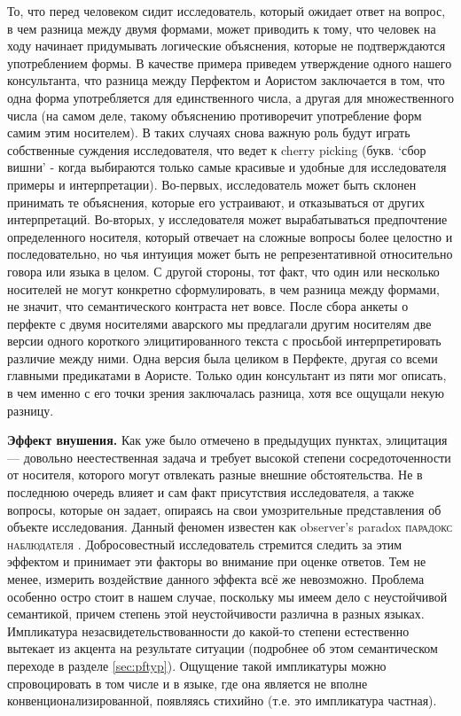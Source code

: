То, что перед человеком сидит исследователь, который ожидает ответ на вопрос, в чем разница между двумя формами, может приводить к тому, что человек на ходу начинает придумывать логические объяснения, которые не подтверждаются употреблением формы. В качестве примера приведем утверждение одного нашего консультанта, что разница между Перфектом и Аористом заключается в том, что одна форма употребляется для единственного числа, а другая для множественного числа (на самом деле, такому объяснению противоречит употребление форм самим этим носителем). В таких случаях снова важную роль будут играть собственные суждения исследователя, что ведет к cherry picking (букв. `сбор вишни' - когда выбираются только самые красивые и удобные для исследователя примеры и интерпретации). Во-первых, исследователь может быть склонен принимать те объяснения, которые его устраивают, и отказываться от других интерпретаций. Во-вторых, у исследователя может вырабатываться предпочтение определенного носителя, который отвечает на сложные вопросы более целостно и последовательно, но чья интуиция может быть не репрезентативной относительно говора или языка в целом. С другой стороны, тот факт, что один или несколько носителей не могут конкретно сформулировать, в чем разница между формами, не значит, что семантического контраста нет вовсе. После сбора анкеты о перфекте с двумя носителями аварского мы предлагали другим носителям две версии одного короткого элицитированного текста с просьбой интерпретировать различие между ними. Одна версия была целиком в Перфекте, другая со всеми главными предикатами в Аористе. Только один консультант из пяти мог описать, в чем именно с его точки зрения заключалась разница, хотя все ощущали некую разницу.  
\par \textbf{Эффект внушения.} Как уже было отмечено в предыдущих пунктах, элицитация --- довольно неестественная задача и требует высокой  степени сосредоточенности от носителя, которого могут отвлекать разные внешние обстоятельства. Не в последнюю очередь влияет и сам факт присутствия исследователя, а также вопросы, которые он задает, опираясь на свои умозрительные представления об объекте исследования. Данный феномен известен как observer’s paradox \textsc{парадокс наблюдателя} \citep{labov1972}. Добросовестный исследователь стремится следить за этим эффектом и принимает эти факторы во внимание при оценке ответов. Тем не менее, измерить воздействие данного эффекта всё же невозможно. Проблема особенно остро стоит в нашем случае, поскольку мы имеем дело с неустойчивой семантикой, причем степень этой неустойчивости различна в разных языках. Импликатура незасвидетельствованности до какой-то степени естественно вытекает из акцента на результате ситуации (подробнее об этом семантическом переходе в разделе \ref{sec:pftyp}). Ощущение такой импликатуры можно спровоцировать в том числе и в языке, где она является не вполне конвенционализированной, появляясь стихийно (т.е. это импликатура частная). 
